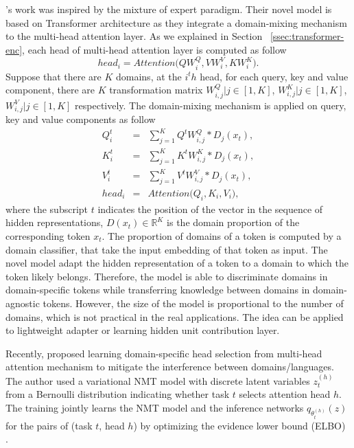 \citet{Jiang20Multi}'s work was inspired by the mixture of expert paradigm. Their novel model is based on Transformer architecture \citep{Vaswani17attention} as they integrate a domain-mixing mechanism to the multi-head attention layer. As we explained in Section ~\ref{ssec:transformer-enc}, each head of multi-head attention layer is computed as follow
\begin{equation}
head_i = Attention \big(QW_i^Q, VW_i^V, KW_i^K \big).
\end{equation}
Suppose that there are $K$ domains, at the $i^th$ head, for each query, key and value component, there are $K$ transformation matrix $W_{i,j}^Q | j \in [1,K]$, $W_{i,j}^K | j \in [1,K]$, $W_{i,j}^V | j \in [1,K]$ respectively. The domain-mixing mechanism is applied on query, key and value components as follow
\begin{equation}
\begin{array}{rcl}
Q_i^t &=& \sum_{j=1}^K Q^tW_{i,j}^Q*\mathit{D}_j(x_t),\\
K_i^t &=& \sum_{j=1}^K K^tW_{i,j}^K*\mathit{D}_j(x_t),\\
V_i^t &=& \sum_{j=1}^K V^tW_{i,j}^V*\mathit{D}_j(x_t),\\
head_i &=& Attention \big( Q_i, K_i, V_i\big),
\end{array}
\end{equation}
where the subscript $t$ indicates the position of the vector in the sequence of hidden representations, $\mathit{D}(x_t) \in \mathbb{R}^{K}$ is the domain proportion of the corresponding token $x_t$. The proportion of domains of a token is computed by a domain classifier, that take the input embedding of that token as input. The novel model adapt the hidden representation of a token to a domain to which the token likely belongs. Therefore, the model is able to discriminate domains in domain-specific tokens while transferring knowledge between domains in domain-agnostic tokens. However, the size of the model is proportional to the number of domains, which is not practical in the real applications. The idea can be applied to lightweight adapter or learning hidden unit contribution layer.

Recently, \citet{Gong21Pay} proposed learning domain-specific head selection from multi-head attention mechanism to mitigate the interference between domains/languages. The author used a variational NMT model with discrete latent variables $z^{(h)}_t$ from a Bernoulli distribution indicating whether task $t$ selects attention head $h$. The training jointly learns the NMT model and the inference networks $q_{\theta^{(h)}_t}(z)$ for the pairs of (task $t$, head $h$) by optimizing the evidence lower bound (ELBO) \cite{zhang16variational}.

